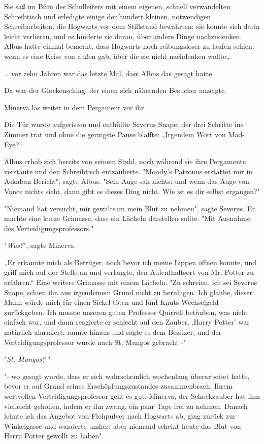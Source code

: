 {Sie saß im Büro des Schulleiters mit einem eigenen, schnell verwandelten Schreibtisch und erledigte einige der hundert kleinen, notwendigen Schreibarbeiten, die Hogwarts vor dem Stillstand bewahrten; sie konnte sich darin leicht verlieren, und es hinderte sie daran, über andere Dinge nachzudenken. Albus hatte einmal bemerkt, dass Hogwarts noch reibungsloser zu laufen schien, wenn es eine Krise von außen gab, über die sie nicht nachdenken wollte…

… vor zehn Jahren war das letzte Mal, dass Albus das gesagt hatte.

Da war der Glockenschlag, der einen sich nähernden Besucher anzeigte.

Minerva las weiter in dem Pergament vor ihr.

Die Tür wurde aufgerissen und enthüllte Severus Snape, der drei Schritte ins Zimmer trat und ohne die geringste Pause blaffte: „Irgendein Wort von Mad-Eye?“

Albus erhob sich bereits von seinem Stuhl, noch während sie ihre Pergamente verstaute und den Schreibtisch entzauberte. "Moody's Patronus erstattet mir in Askaban Bericht", sagte Albus. "Sein Auge sah nichts; und wenn das Auge von Vance nichts sieht, dann gibt es dieses Ding nicht. Wie ist es dir selbst ergangen?"

"Niemand hat versucht, mir gewaltsam mein Blut zu nehmen", sagte Severus. Er machte eine kurze Grimasse, dass ein Lächeln darstellen sollte. "Mit Ausnahme des Verteidigungsprofessors."

"\emph{Was?}", sagte Minerva.

„Er erkannte mich als Betrüger, noch bevor ich meine Lippen öffnen konnte, und griff mich auf der Stelle an und verlangte, den Aufenthaltsort von Mr. Potter zu erfahren.“ Eine weitere Grimasse mit einem Lächeln. "Zu schreien, ich sei Severus Snape, schien ihn aus irgendeinem Grund nicht zu beruhigen. Ich glaube, dieser Mann würde mich für einen Sickel töten und fünf Knuts Wechselgeld zurückgeben. Ich musste unseren guten Professor Quirrell betäuben, was nicht einfach war, und dann reagierte er schlecht auf den Zauber. ‚Harry Potter' war natürlich alarmiert, rannte hinaus und sagte es dem Besitzer, und der Verteidigungsprofessor wurde nach St. Mungos gebracht -"

"\emph{St. Mungos?} "

"- wo gesagt wurde, dass er sich wahrscheinlich wochenlang überarbeitet hatte, bevor er auf Grund seines Erschöpfungszustandes zusammenbrach. Ihrem wertvollen Verteidigungsprofessor geht es gut, Minerva, der Schockzauber hat ihm vielleicht geholfen, indem er ihn zwang, ein paar Tage frei zu nehmen. Danach lehnte ich das Angebot von Flohpulver nach Hogwarts ab, ging zurück zur Winkelgasse und wanderte umher; aber niemand scheint heute das Blut von Herrn Potter gewollt zu haben".

}
